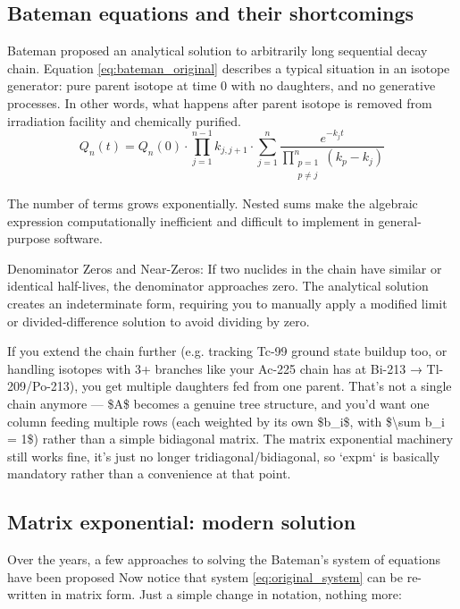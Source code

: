 \subsection{Bateman equations and their shortcomings}
Bateman proposed an analytical solution to arbitrarily long sequential decay chain. Equation \eqref{eq:bateman_original} describes a typical situation in an isotope generator: pure parent isotope at time 0 with no daughters, and no generative processes. In other words, what happens after parent isotope is removed from irradiation facility and chemically purified.
\begin{equation}
	Q_{n}(t) = Q_n(0)\cdot\prod_{j=1}^{n-1}k_{j,j+1}\cdot\sum_{j=1}^{n}\frac{e^{-k_{j}t}}{\displaystyle\prod_{\substack{p=1 \\ p\ne j}}^{n}(k_{p}-k_{j})}
	\label{eq:bateman_original}
\end{equation}

The number of terms grows exponentially. Nested sums make the algebraic expression computationally inefficient and difficult to implement in general-purpose software. 

Denominator Zeros and Near-Zeros: If two nuclides in the chain have similar or identical half-lives, the denominator approaches zero. The analytical solution creates an indeterminate form, requiring you to manually apply a modified limit or divided-difference solution to avoid dividing by zero.

If you extend the chain further (e.g. tracking Tc-99 ground state buildup too, or handling isotopes with 3+ branches like your Ac-225 chain has at Bi-213 → Tl-209/Po-213), you get multiple daughters fed from one parent. That's not a single chain anymore — \$A\$ becomes a genuine tree structure, and you'd want one column feeding multiple rows (each weighted by its own \$b\_i\$, with \$\textbackslash{}sum b\_i = 1\$) rather than a simple bidiagonal matrix. The matrix exponential machinery still works fine, it's just no longer tridiagonal/bidiagonal, so `expm` is basically mandatory rather than a convenience at that point.

\subsection{Matrix exponential: modern solution}
Over the years, a few approaches to solving the Bateman's system of equations have been proposed \cite{maren_implementation_2016} 
Now notice that system \eqref{eq:original_system} can be re-written in matrix form. Just a simple change in notation, nothing more:

